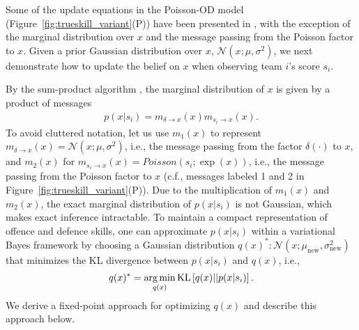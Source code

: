 \documentclass[runningheads,a4paper]{llncs}
\newcommand{\unindent}{\hspace{-1mm}}
\def\argmin{\operatornamewithlimits{arg\,min}}
\begin{document}
Some of the update equations in the Poisson-OD model
(Figure~\ref{fig:trueskill_variant}(P)) have been presented in
\cite{herbrich06569}, with the exception of the marginal distribution
over $x$ and the message passing from the Poisson factor to $x$. Given
a prior Gaussian distribution over $x$, $\mathcal{N}(x;\mu,
\sigma^2)$, we next
demonstrate how to update the belief on $x$ when observing
team $i$'s score $s_i$.

By the sum-product algorithm \cite{kschischang01498}, the
marginal distribution of $x$ is given by a product of messages
{\small
\begin{align}\label{eq:marginal}
    p(x|s_i) = m_{\delta \rightarrow x}(x) m_{s_i \rightarrow x}(x).
\end{align}}
\unindent To avoid cluttered notation, let us use $m_1(x)$ to represent
$m_{\delta \rightarrow x}(x) = \mathcal{N}(x;\mu,\sigma^2)$, i.e., the message
passing from the factor $\delta(\cdot)$ to $x$, and $m_2(x)$ for
$m_{s_i\rightarrow x}(x) = Poisson(s_i;\exp(x))$, i.e.,
the message passing from the Poisson
factor to $x$ (c.f., messages labeled 1 and 2 in
Figure~\ref{fig:trueskill_variant}(P)). Due to the multiplication of
$m_{1}(x)$ and $m_{2}(x)$, the exact marginal distribution of
$p(x|s_i)$ is not Gaussian, which makes exact inference
intractable. To maintain a compact representation of offence and
defence skills, one can approximate $p(x|s_i)$ within a variational
Bayes framework by %
choosing a Gaussian distribution $q(x)^*:
\mathcal{N}(x;\mu_{\text{new}}, \sigma_{\text{new}}^2)$ that minimizes
the KL divergence between $p(x|s_i)$ and $q(x)$, i.e.,
{\small
\begin{align}\label{eq:marginal2}
    q(x)^* = \argmin_{q(x)} \text{KL}\left[q(x)|| p(x|s_i)\right].
\end{align}}
We derive a fixed-point approach for optimizing $q(x)$ \cite{Beal:EMFixedPoint02} and describe this approach below.
\end{document}
